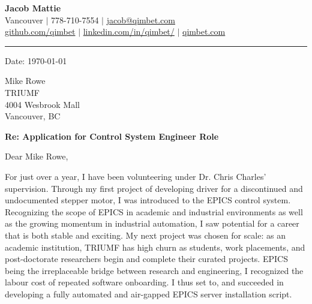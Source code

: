 \documentclass[a4paper,10pt]{article}
\begin{document}
	\begin{center}
		\vspace{-2.05mm}
		{\huge \bfseries Jacob Mattie} \\[0.75em]
		Vancouver $|$ 778-710-7554 $|$ 
		\href{mailto:jacob@qimbet.com}{jacob@qimbet.com} \\
		[0.15em]
		
		\href{https://github.com/qimbet}{github.com/qimbet} $|$ 
		\href{https://www.linkedin.com/in/qimbet/}{linkedin.com/in/qimbet/}  $|$
		\href{www.qimbet.com}{qimbet.com}
		

		\noindent\rule{\textwidth}{0.4pt}

		\vspace{2.05mm}
		\noindent
		
	\end{center}



\begin{flushright}
	\vspace{-0.75em}	
	Date: \today
\end{flushright}

\vspace{3em}

\noindent
{\fontsize{11}{13}\selectfont Mike Rowe}\\[0.75em]
TRIUMF\\
4004 Wesbrook Mall\\
Vancouver, BC



\vspace{0.75em}

\noindent
\textbf{Re: Application for Control System Engineer Role}

\vspace{2em}

Dear Mike Rowe,

\vspace{1.25em}

For just over a year, I have been volunteering under Dr. Chris Charles' supervision. Through my first project of developing driver for a discontinued and undocumented stepper motor, I was introduced to the EPICS control system. Recognizing the scope of EPICS in academic and industrial environments as well as the growing momentum in industrial automation, I saw potential for a career that is both stable and exciting. My next project was chosen for scale: as an academic institution, TRIUMF has high churn as students, work placements, and post-doctorate researchers begin and complete their curated projects.  EPICS being the irreplaceable bridge between research and engineering, I recognized the labour cost of repeated software onboarding. I thus set to, and succeeded in developing a fully automated and air-gapped EPICS server installation script.
\end{document}

